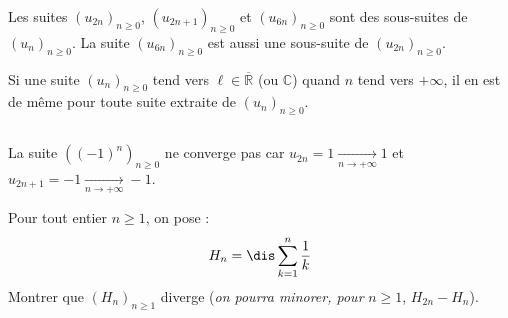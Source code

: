 \documentclass[a4paper,10pt]{report}
\begin{document}
\begin{ex} Les suites $(u_{2n})_{n \geq 0}$, $(u_{2n+1})_{n \geq 0}$ et $(u_{6n})_{n \geq 0}$ sont des sous-suites de $(u_n)_{n \geq 0}$. La suite $(u_{6n})_{n \geq 0}$ est aussi une sous-suite de $(u_{2n})_{n \geq 0}$.
\end{ex}

\begin{prop} Si une suite $(u_n)_{n \geq 0}$ tend vers $\ell \in \overline{\mathbb{R}}$ (ou $\mathbb{C}$) quand $n$ tend vers $+ \infty$, il en est de même pour toute suite extraite de $(u_n)_{n \geq 0}$.
\end{prop}

\begin{preuve} 


%
%
%

\vspace{5cm}
\end{preuve}

\newpage

$\phantom{}$

\vspace{2.5cm}


\begin{ex} La suite $((-1)^n)_{n \geq 0}$ ne converge pas car $ u_{2n}= 1 \underset{n \rightarrow + \infty}{\longrightarrow} 1$ et $ u_{2n+1} = -1 \underset{n \rightarrow + \infty}{\longrightarrow} -1$.
\end{ex}

\begin{exa} Pour tout entier $n \geq 1$, on pose :
$$H_n = \dis \sum_{k=1}^n \dfrac{1}{k} $$
Montrer que $(H_n)_{n \geq 1}$ diverge (\textit{on pourra minorer, pour} $n \geq 1$, $H_{2n}-H_n$).
\end{exa}
\end{document}
